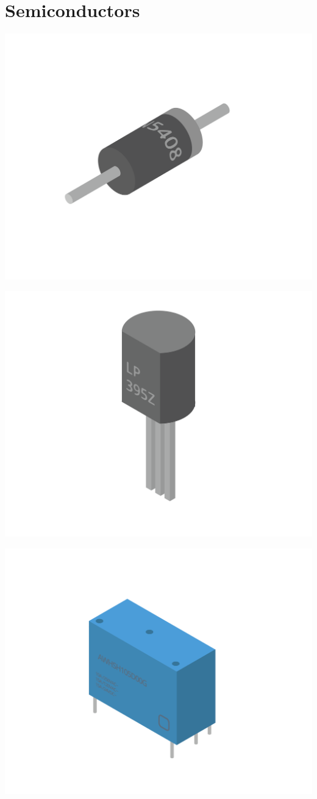 \documentclass{article}
\begin{document}
\chapter{Semiconductors}

\includegraphics[width=.75\textwidth]{diodeReal.png}

\includegraphics[width=.75\textwidth]{relayReal.png}

\includegraphics[width=.75\textwidth]{transistorReal.png}
\end{document}
